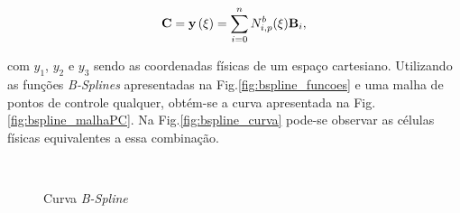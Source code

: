 \documentclass[tese_patricia]{subfiles}
\begin{document}
\begin{align}
\mathbf{C} =\mathbf{y}\left(\xi\right) = \sum_{i=0}^{n}N^b_{i,p}(\xi)\mathbf{B}_i,
\end{align}

\noindent com $y_1$, $y_2$ e $y_3$ sendo as coordenadas físicas de um espaço cartesiano. Utilizando as funções \textit{B-Splines} apresentadas na Fig.\ref{fig:bspline_funcoes} e uma malha de pontos de controle qualquer, obtém-se a curva apresentada na Fig.\ref{fig:bspline_malhaPC}. Na Fig.\ref{fig:bspline_curva} pode-se observar as células físicas equivalentes a essa combinação.

\begin{figure}[!htb]
	\centering	
	 \ \ 
	\caption{Curva \textit{B-Spline}}
\end{figure}
\end{document}

